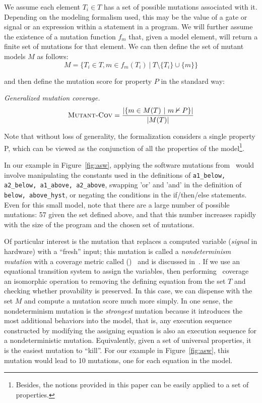 We assume each element $T_i \in T$ has a set of possible mutations associated with it.  Depending on the modeling formalism used, this may be the value of a gate or signal or an expression within a statement in a program.  We will further assume the existence of a mutation function $f_{m}$ that, given a model element, will return a finite set of mutations for that element.  We can then define the set of mutant models $M$ as follows:
\[
    M = \{ T_i \in T, m \in f_{m}(T_i)\ |\ T \setminus \{T_i\} \cup \{m\} \}
\]

\noindent and then define the mutation score for property $P$ in the standard way:

\begin{definition} {\emph{Generalized mutation coverage.} } \\
\[
   \text{\sc Mutant-Cov} = \frac{ | \{m \in M(T)~|~ m \nvdash P\} |}{|M(T)|}
\]
\end{definition}
Note that without loss of generality, the formalization considers a single property P, which can be viewed as the conjunction of all the properties of the model\footnote{Besides, the notions provided in this paper can be easily applied to a set of properties.}.

In our example in Figure~\ref{fig:asw}, applying the software mutations from~\cite{Andrews06:mutation} would involve manipulating the constants used in the definitions of \texttt{a1\_below, a2\_below, a1\_above, a2\_above}, swapping 'or' and 'and' in the definition of \texttt{below, above\_hyst}, or negating the conditions in the if/then/else statements.  Even for this small model, note that there are a large number of possible mutations: 57 given the set defined above, and that this number increases rapidly with the size of the program and the chosen set of mutations.

Of particular interest is the mutation that replaces a computed variable ({\em signal} in hardware) with a ``fresh'' input; this mutation is called a {\em nondeterminism mutation} with a coverage metric called (\nondetcov)~\cite{chockler2010coverage} and is discussed in~\cite{Kupferman:2006:SCF,kupferman_theory_2008,chockler2010coverage}.  If we use an equational transition system to assign the variables, then performing \nondetcov\ coverage an isomorphic operation to removing the defining equation from the set $T$ and checking whether provability is preserved.  In this case, we can dispense with the set $M$ and compute a mutation score much more simply. In one sense, the nondeterminism mutation is the {\em strongest} mutation because it introduces the most additional behaviors into the model, that is, any execution sequence constructed by modifying the assigning equation is also an execution sequence for a nondeterministic mutation.  Equivalently, given a set of universal properties, it is the easiest mutation to ``kill''.  For our example in Figure~\ref{fig:asw}, this mutation would lead to 10 mutations, one for each equation in the model.

